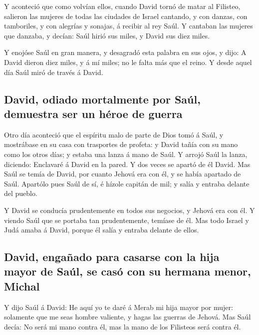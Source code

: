  Y aconteció que como volvían ellos, cuando David tornó de
matar al Filisteo, salieron las mujeres de todas las ciudades de Israel
cantando, y con danzas, con tamboriles, y con alegrías y sonajas, á
recibir al rey Saúl.  Y cantaban las mujeres que danzaba, y
decían: Saúl hirió sus miles, y David sus diez miles.

 Y enojóse Saúl en gran manera, y desagradó esta palabra en
sus ojos, y dijo: A David dieron diez miles, y á mí miles; no le falta
más que el reino.  Y desde aquel día Saúl miró de través á
David.

\hypertarget{david-odiado-mortalmente-por-sauxfal-demuestra-ser-un-huxe9roe-de-guerra}{%
\subsection{David, odiado mortalmente por Saúl, demuestra ser un héroe
de
guerra}\label{david-odiado-mortalmente-por-sauxfal-demuestra-ser-un-huxe9roe-de-guerra}}

 Otro día aconteció que el espíritu malo de parte de Dios
tomó á Saúl, y mostrábase en su casa con trasportes de profeta: y David
tañía con su mano como los otros días; y estaba una lanza á mano de
Saúl.  Y arrojó Saúl la lanza, diciendo: Enclavaré á David
en la pared. Y dos veces se apartó de él David.  Mas Saúl
se temía de David, por cuanto Jehová era con él, y se había apartado de
Saúl.  Apartólo pues Saúl de sí, é hízole capitán de mil; y
salía y entraba delante del pueblo.

 Y David se conducía prudentemente en todos sus negocios, y
Jehová era con él.  Y viendo Saúl que se portaba tan
prudentemente, temíase de él.  Mas todo Israel y Judá amaba
á David, porque él salía y entraba delante de ellos.

\hypertarget{david-engauxf1ado-para-casarse-con-la-hija-mayor-de-sauxfal-se-casuxf3-con-su-hermana-menor-michal}{%
\subsection{David, engañado para casarse con la hija mayor de Saúl, se
casó con su hermana menor,
Michal}\label{david-engauxf1ado-para-casarse-con-la-hija-mayor-de-sauxfal-se-casuxf3-con-su-hermana-menor-michal}}

 Y dijo Saúl á David: He aquí yo te daré á Merab mi hija
mayor por mujer: solamente que me seas hombre valiente, y hagas las
guerras de Jehová. Mas Saúl decía: No será mi mano contra él, mas la
mano de los Filisteos será contra él.

